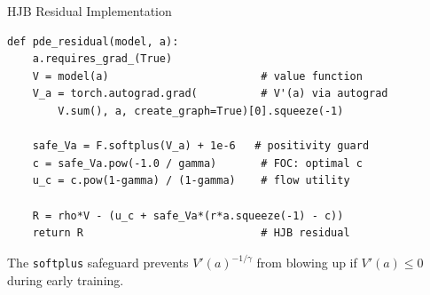 \documentclass[aspectratio=169,11pt]{beamer}
\begin{document}
\begin{frame}[fragile]{HJB Residual Implementation}
\begin{lstlisting}[basicstyle=\footnotesize\ttfamily]
def pde_residual(model, a):
    a.requires_grad_(True)
    V = model(a)                        # value function
    V_a = torch.autograd.grad(          # V'(a) via autograd
        V.sum(), a, create_graph=True)[0].squeeze(-1)

    safe_Va = F.softplus(V_a) + 1e-6   # positivity guard
    c = safe_Va.pow(-1.0 / gamma)       # FOC: optimal c
    u_c = c.pow(1-gamma) / (1-gamma)    # flow utility

    R = rho*V - (u_c + safe_Va*(r*a.squeeze(-1) - c))
    return R                            # HJB residual
\end{lstlisting}

\vspace{0.1em}
{\footnotesize The \texttt{softplus} safeguard prevents $V'(a)^{-1/\gamma}$ from blowing up if $V'(a) \leq 0$ during early training.}
\end{frame}
\end{document}
